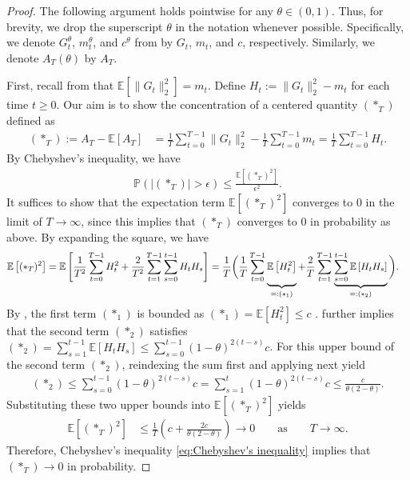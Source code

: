 \documentclass[a4paper, 11pt]{article}
\newcommand{\E}{\mathbb E}
\theoremstyle{definition}
\begin{document}
\begin{proof}
    The following argument holds pointwise for any $\theta \in (0, 1)$.
    Thus, for brevity, we drop the superscript $\theta$ in the notation whenever possible.
    Specifically, we denote $G_t^\theta$, $m_t^\theta$, and $c^\theta$ from  by $G_t$, $m_t$, and $c$, respectively.
    Similarly, we denote $A_T(\theta)$ by $A_T$.
    
    First, recall from  that $\E[ \| G_t \|_2^2 ] = m_t$.
    Define $H_t := \| G_t \|_2^2 - m_t$ for each time $t \ge 0$.
    Our aim is to show the concentration of a centered quantity $(*_T)$ defined as
	\begin{align}
		(*_T) := A_T - \E[ A_T ] & = \frac{1}{T} \sum_{t = 0}^{T-1} \| G_t \|_2^2 - \frac{1}{T} \sum_{t = 0}^{T-1} m_t = \frac{1}{T} \sum_{t = 0}^{T-1} H_t .
	\end{align}
    By Chebyshev's inequality, we have
	\begin{align}\label{eq:Chebyshev's inequality}
		\mathbb{P}\left( \left| (*_T) \right| > \epsilon \right) \le \frac{ \E\left[ (*_T)^2 \right] }{ \epsilon^2 } .
	\end{align}
    It suffices to show that the expectation term $\E[ (*_T)^2 ]$ converges to $0$ in the limit of $T \to \infty$, since this implies that $(*_T)$ converges to $0$ in probability as above.
	By expanding the square, we have
	\begin{align}
		\E\left[ (*_T)^2 \right] & = \E\left[ \frac{1}{T^2} \sum_{t = 0}^{T-1} H_t^2 + \frac{2}{T^2} \sum_{t=1}^{T-1} \sum_{s=0}^{t-1} H_t H_s \right] = \frac{1}{T} \bigg( \frac{1}{T} \sum_{t=0}^{T-1} \underbrace{ \vphantom{\sum_{s=1}^{t-1}} \E\left[ H_t^2 \right] }_{ =: (*_1) } + \frac{2}{T} \sum_{t=1}^{T-1} \underbrace{ \sum_{s=0}^{t-1} \E\left[ H_t H_s \right] }_{ =: (*_2) } \bigg) . 
	\end{align}
    By , the first term $(*_1)$ is bounded as $(*_1) = \E[ H_t^2 ] \le c$ .
     further implies that the second term $(*_2)$ satisfies $(*_2) = \sum_{s=1}^{t-1} \E\left[ H_t H_s \right] \le \sum_{s=0}^{t-1} (1 - \theta)^{2(t-s)} c$.
    For this upper bound of the second term $(*_2)$, reindexing the sum first and applying  next yield
	\begin{align}
		(*_2) \le \sum_{s=0}^{t-1} (1 - \theta)^{2(t-s)} c = \sum_{s=1}^{t} (1 - \theta)^{2(t-s)} c \le \frac{c}{\theta (2 - \theta)} .
	\end{align}
	Substituting these two upper bounds into $\E[ (*_T)^2 ]$ yields
    \begin{align}
		\E\left[ (*_T)^2 \right] & \le \frac{1}{T} \left( c + \frac{2 c}{\theta (2 - \theta)} \right) \longrightarrow 0 \qquad \text{as} \qquad T \longrightarrow \infty .
	\end{align}
    Therefore, Chebyshev's inequality \eqref{eq:Chebyshev's inequality} implies that $(*_T) \to 0$ in probability.
    

\end{proof}
\end{document}
